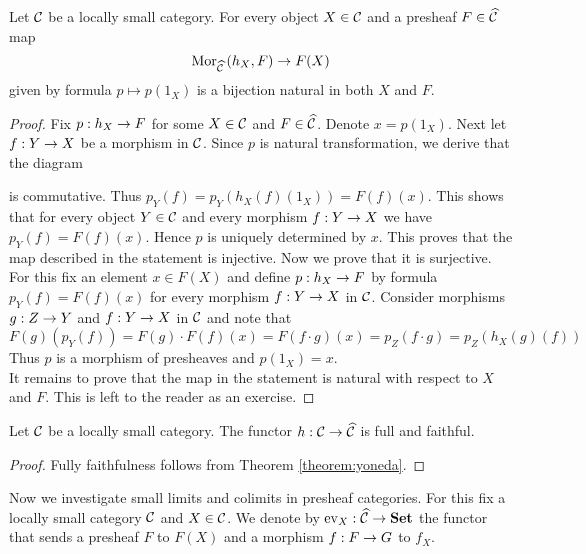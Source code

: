\begin{theorem}\label{theorem:yoneda}
Let ${\mathcal C}$ be a locally small category. For every object $X\in {\mathcal C}$ and a presheaf $F\in \widehat{{\mathcal C}}$ map
$$\mathrm{Mor}_{\widehat{{\mathcal C}}}\left(h_X,F\right)\rightarrow F(X)$$ 
given by formula $p \mapsto p(1_X)$ is a bijection natural in both $X$ and $F$.
\end{theorem}
\begin{proof}
Fix $p:h_X\rightarrow F$ for some $X\in {\mathcal C}$ and $F\in \widehat{{\mathcal C}}$. Denote $x=p(1_X)$. Next let $f:Y\rightarrow X$ be a morphism in ${\mathcal C}$.  Since $p$ is natural transformation, we derive that the diagram
\begin{center}
\end{center}
is commutative. Thus $p_Y\left(f\right)=p_Y\left( h_X(f)(1_X)\right)=F(f)(x)$. This shows that for every object $Y\in {\mathcal C}$ and every morphism $f:Y\rightarrow X$ we have $p_Y(f)=F(f)(x)$. Hence $p$ is uniquely determined by $x$. This proves that the map described in the statement is injective. Now we prove that it is surjective. For this fix an element $x\in F(X)$ and define $p:h_X\rightarrow F$ by formula $p_Y(f)=F(f)(x)$ for every morphism $f:Y\rightarrow X$ in ${\mathcal C}$. Consider morphisms $g:Z\rightarrow Y$ and $f:Y\rightarrow X$ in ${\mathcal C}$ and note that
$$F(g)\left( p_{Y}(f)\right)=F(g)\cdot F(f)\left(x\right)=F(f\cdot g)(x)=p_{Z}(f\cdot g)=p_{Z}\left(h_X(g)(f)\right)$$
Thus $p$ is a morphism of presheaves and $p(1_X)=x$.\\
It remains to prove that the map in the statement is natural with respect to $X$ and $F$. This is left to the reader as an exercise.
\end{proof}

\begin{corollary}\label{corollary:yonedaembedding}
Let ${\mathcal C}$ be a locally small category. The functor $h:{\mathcal C}\rightarrow \widehat{{\mathcal C}}$ is full and faithful. 
\end{corollary}
\begin{proof}
Fully faithfulness follows from Theorem \ref{theorem:yoneda}. 
\end{proof}
\noindent
Now we investigate small limits and colimits in presheaf categories. For this fix a locally small category ${\mathcal C}$ and $X\in {\mathcal C}$. We denote by $\mathrm{ev}_X:\widehat{{\mathcal C}}\rightarrow \mathbf{Set}$ the functor that sends a presheaf $F$ to $F(X)$ and a morphism $f:F\rightarrow G$ to $f_X$.

